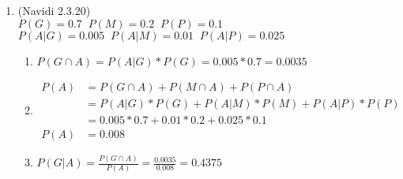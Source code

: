 \documentclass[11pt]{article}
\begin{document}
\begin{enumerate}
        \item (Navidi 2.3.20) \\ %
        $P(G)=0.7 \;\; P(M)=0.2 \;\; P(P)=0.1$ \\
        $P(A|G)=0.005 \;\; P(A|M)=0.01 \;\; P(A|P)=0.025$
        \begin{enumerate}
                \item %
                $P(G \cap A) = P(A|G)*P(G) = 0.005 * 0.7 = 0.0035$
                \item %
                \begin{align*}
                        P(A) &= P(G \cap A) + P(M \cap A) + P(P \cap A) \\
                             &= P(A|G)*P(G) + P(A|M)*P(M) + P(A|P)*P(P) \\
                             &= 0.005 * 0.7 + 0.01 * 0.2 + 0.025 * 0.1 \\ 
                        P(A) &=0.008 
                \end{align*}
                \item %
                $P(G|A) = \frac{P(G \cap A)}{P(A)} = \frac{0.0035}{0.008} = 0.4375$
        \end{enumerate}


\end{enumerate}
\end{document}
